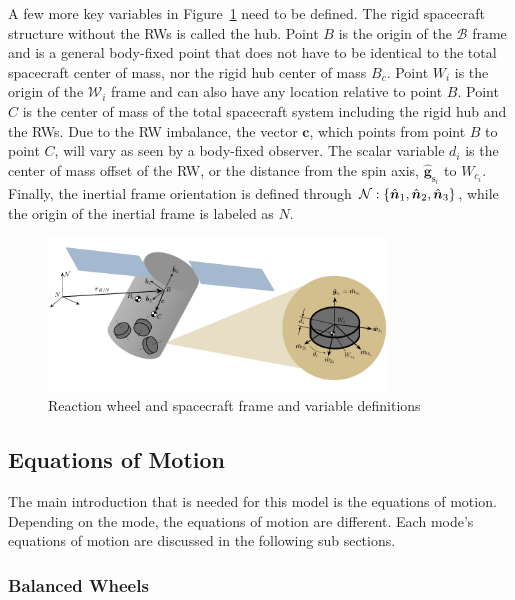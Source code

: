 A few more key variables in Figure~\ref{fig:scplusrw} need to be defined. The rigid spacecraft structure without the RWs is called the hub.  Point $B$ is the origin of the $\mathcal{B}$ frame and is a general body-fixed point that does not have to be identical to the total spacecraft center of mass, nor the rigid hub center of mass $B_{c}$. Point $W_i$ is the origin of the $\mathcal{W}_i$ frame and can also have any location relative to point $B$. Point $C$ is the center of mass of the total spacecraft system including the rigid hub and the RWs. Due to the RW imbalance, the vector $\bm c$, which points from point $B$ to point $C$, will vary as seen by a body-fixed observer. The scalar variable $d_i$ is the center of mass offset of the RW, or the distance from the spin axis, $\hat{\bm g}_{\text{s}_i}$ to $W_{c_i}$.  Finally, the inertial frame orientation is defined through $\frameDefinition{N}$, while the origin of the inertial frame is labeled as $N$.

\begin{figure}[htbp]
	\centerline{
		\includegraphics[width=0.8\textwidth]{Figures/scplusrw}}
	\caption{Reaction wheel and spacecraft frame and variable definitions}
	\label{fig:scplusrw}
\end{figure}

\subsection{Equations of Motion}

The main introduction that is needed for this model is the equations of motion. Depending on the mode, the equations of motion are different. Each mode's equations of motion are discussed in the following sub sections.

\subsubsection{Balanced Wheels}

